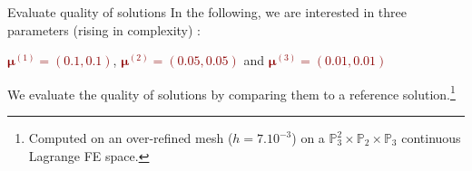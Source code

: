 \begin{frame}{Evaluate quality of solutions}
	In the following, we are interested in three parameters (rising in complexity) :

	\begin{center}
		\textcolor<2>{darkred}{$\bm{\mu}^{(1)} = (0.1,0.1)$}, \textcolor<3>{darkred}{$\bm{\mu}^{(2)} = (0.05,0.05)$} and \textcolor<4>{darkred}{$\bm{\mu}^{(3)} = (0.01,0.01)$}
	\end{center}

	We evaluate the quality of solutions by comparing them to a reference solution.\footnote[frame,1]{Computed on an over-refined mesh ($h=7.10^{-3}$) on a $\mathbb{P}_3^2\times \mathbb{P}_2 \times \mathbb{P}_3$ continuous Lagrange FE space.}

	\vspace{10pt}


	\vspace{3pt}
	\vspace{-3pt}

	\begin{center}
	\end{center}

\end{frame}